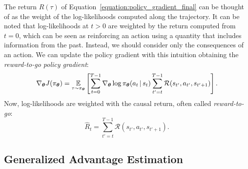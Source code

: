 %
\begin{remark*}
%
The return $R(\tau)$ of Equation~\eqref{equation:policy_gradient_final} can be thought of as the weight of the log-likelihoods computed along the trajectory.
It can be noted that log-likelihoods at $t > 0$ are weighted by the return computed from $t=0$, which can be seen as reinforcing an action using a quantity that includes information from the past.
Instead, we should consider only the consequences of an action.
We can update the policy gradient with this intuition obtaining the \emph{reward-to-go policy gradient}:
%
\begin{equation}
    \label{equation:policy_gradient_reward_to_go}
    \nabla_{\boldsymbol{\theta}} J(\pi_{\boldsymbol{\theta}})
    = \operatorname*{\mathbb{E}}_{\tau \sim \pi_{\boldsymbol{\theta}}} \left[ \sum_{t=0}^{T-1} \nabla_{\boldsymbol{\theta}} \log \pi_{\boldsymbol{\theta}}(a_t \operatorname{\mid} s_t) \sum_{t'=t}^{T-1} \mathcal{R}(s_{t'}, a_{t'}, s_{t'+1}) \right] .
\end{equation}
%
Now, log-likelihoods are weighted with the causal return, often called \emph{reward-to-go}:
%
\begin{equation*}
    \hat{R}_t = \sum_{t'=t}^{T-1} \mathcal{R}(s_{t'}, a_{t'}, s_{t'+1}) .
\end{equation*}
%
\end{remark*}

\subsection{Generalized Advantage Estimation}

